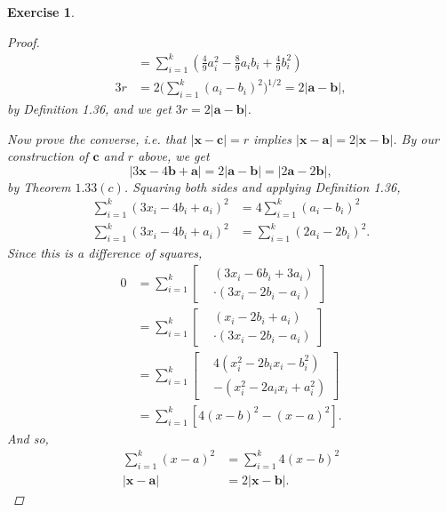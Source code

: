 \documentclass[10pt,letterpaper]{amsart}
\newtheorem{exercise}{Exercise}[section]
\theoremstyle{definition}
\theoremstyle{remark}
\numberwithin{equation}{exercise}
\begin{document}
\begin{multicols}{2}
\begin{exercise}
\begin{proof}
\begin{align*}
        &= \sum_{i=1}^k \left( \frac{4}{9}a_i^2 - \frac{8}{9} a_ib_i + \frac{4}{9}b_i^2 \right)\\
        3r &= 2\Bigg(\sum_{i=1}^k (a_i-b_i)^2\Bigg)^{1/2} = 2|\mathbf{a}-\mathbf{b}|,
      \end{align*}
      by Definition 1.36, and we get $3r = 2|\mathbf{a}-\mathbf{b}|$.
      \par Now prove the converse, i.e. that $|\mathbf{x} - \mathbf{c}| = r$ implies $|\mathbf{x} - \mathbf{a}| = 2|\mathbf{x} - \mathbf{b}|$. By our construction of $\mathbf{c}$ and $r$ above, we get
      \begin{equation*}
        |3\mathbf{x} - 4\mathbf{b} + \mathbf{a}| = 2|\mathbf{a}-\mathbf{b}| = |2\mathbf{a}-2\mathbf{b}|,
      \end{equation*}
      by Theorem $1.33(c)$. Squaring both sides and applying Definition 1.36,
      \begin{align*}
        \sum_{i=1}^k (3x_i-4b_i+a_i)^2 &= 4\sum_{i=1}^k (a_i-b_i)^2\\
        \sum_{i=1}^k (3x_i-4b_i+a_i)^2 &= \sum_{i=1}^k (2a_i-2b_i)^2.
      \end{align*}
      Since this is a difference of squares,
      \begin{align*}
        0 &= \sum_{i=1}^k \left[
        \begin{aligned}
          &(3x_i-6b_i+3a_i)\\
          &\cdot(3x_i-2b_i-a_i)
        \end{aligned} \right]\\
        &= \sum_{i=1}^k \left[
        \begin{aligned}
          &(x_i-2b_i+a_i)\\
          &\cdot(3x_i-2b_i-a_i)
        \end{aligned} \right]\\
        &= \sum_{i=1}^k \left[
        \begin{aligned}
          &4(x_i^2 - 2b_ix_i - b_i^2)\\
          &- (x_i^2 - 2a_ix_i + a_i^2)
        \end{aligned} \right]\\
        &= \sum_{i=1}^k \left[ 4(x-b)^2 - (x-a)^2 \right].
      \end{align*}
      And so,
      \begin{align*}
        \sum_{i=1}^k (x-a)^2 &= \sum_{i=1}^k 4(x-b)^2 \\
        |\mathbf{x}-\mathbf{a}| &= 2|\mathbf{x}-\mathbf{b}|.

\end{align*}
\end{proof}
\end{exercise}
\end{multicols}
\end{document}
